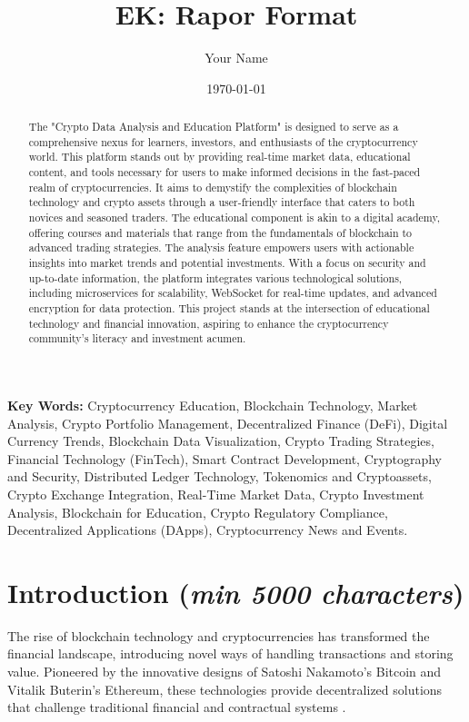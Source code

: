 \documentclass[12pt]{report}
\title{EK: Rapor Format}
\author{Your Name}
\date{\today}
\renewcommand{\thesection}{\arabic{section}}
\newcommand{\characters}[1]{(\textit{min #1 characters})}
\begin{document}
\begin{abstract}
The "Crypto Data Analysis and Education Platform" is designed to serve as a comprehensive nexus for learners, investors, and enthusiasts of the cryptocurrency world. This platform stands out by providing real-time market data, educational content, and tools necessary for users to make informed decisions in the fast-paced realm of cryptocurrencies. It aims to demystify the complexities of blockchain technology and crypto assets through a user-friendly interface that caters to both novices and seasoned traders. The educational component is akin to a digital academy, offering courses and materials that range from the fundamentals of blockchain to advanced trading strategies. The analysis feature empowers users with actionable insights into market trends and potential investments. With a focus on security and up-to-date information, the platform integrates various technological solutions, including microservices for scalability, WebSocket for real-time updates, and advanced encryption for data protection. This project stands at the intersection of educational technology and financial innovation, aspiring to enhance the cryptocurrency community's literacy and investment acumen.
\end{abstract}


\textbf{Key Words:} Cryptocurrency Education, Blockchain Technology, Market Analysis, Crypto Portfolio Management, Decentralized Finance (DeFi), Digital Currency Trends, Blockchain Data Visualization, Crypto Trading Strategies, Financial Technology (FinTech), Smart Contract Development, Cryptography and Security, Distributed Ledger Technology, Tokenomics and Cryptoassets, Crypto Exchange Integration, Real-Time Market Data, Crypto Investment Analysis, Blockchain for Education, Crypto Regulatory Compliance, Decentralized Applications (DApps), Cryptocurrency News and Events.


\tableofcontents
\renewcommand{\thechapter}{\arabic{chapter}}
\renewcommand{\thesection}{\arabic{section}}
\setcounter{secnumdepth}{3} %
\setcounter{tocdepth}{3} %

\newpage

\section{Introduction \characters{5000}}
The rise of blockchain technology and cryptocurrencies has transformed the financial landscape, introducing novel ways of handling transactions and storing value. Pioneered by the innovative designs of Satoshi Nakamoto's Bitcoin and Vitalik Buterin's Ethereum, these technologies provide decentralized solutions that challenge traditional financial and contractual systems \cite{nakamoto2008, buterin2014}.
\end{document}
